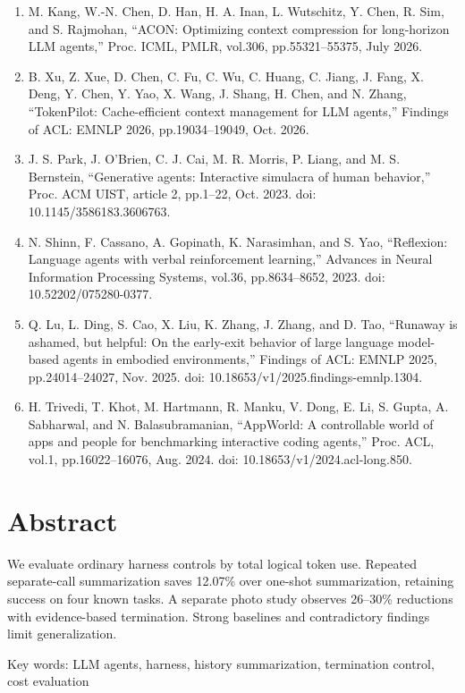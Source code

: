 \documentclass{article}
\begin{document}
\begin{enumerate}
\item M. Kang, W.-N. Chen, D. Han, H. A. Inan, L. Wutschitz, Y. Chen,
R. Sim, and S. Rajmohan,
``ACON: Optimizing context compression for long-horizon LLM agents,''
Proc. ICML, PMLR, vol.306, pp.55321--55375, July 2026.

\item B. Xu, Z. Xue, D. Chen, C. Fu, C. Wu, C. Huang, C. Jiang, J. Fang,
X. Deng, Y. Chen, Y. Yao, X. Wang, J. Shang, H. Chen, and N. Zhang,
``TokenPilot: Cache-efficient context management for LLM agents,''
Findings of ACL: EMNLP 2026, pp.19034--19049, Oct. 2026.

\item J. S. Park, J. O'Brien, C. J. Cai, M. R. Morris, P. Liang, and M. S. Bernstein,
``Generative agents: Interactive simulacra of human behavior,''
Proc. ACM UIST, article 2, pp.1--22, Oct. 2023.
doi: 10.1145/3586183.3606763.

\item N. Shinn, F. Cassano, A. Gopinath, K. Narasimhan, and S. Yao,
``Reflexion: Language agents with verbal reinforcement learning,''
Advances in Neural Information Processing Systems, vol.36, pp.8634--8652, 2023.
doi: 10.52202/075280-0377.

\item Q. Lu, L. Ding, S. Cao, X. Liu, K. Zhang, J. Zhang, and D. Tao,
``Runaway is ashamed, but helpful: On the early-exit behavior of large language model-based agents in embodied environments,''
Findings of ACL: EMNLP 2025, pp.24014--24027, Nov. 2025.
doi: 10.18653/v1/2025.findings-emnlp.1304.

\item H. Trivedi, T. Khot, M. Hartmann, R. Manku, V. Dong, E. Li, S. Gupta,
A. Sabharwal, and N. Balasubramanian,
``AppWorld: A controllable world of apps and people for benchmarking interactive coding agents,''
Proc. ACL, vol.1, pp.16022--16076, Aug. 2024.
doi: 10.18653/v1/2024.acl-long.850.

\end{enumerate}

\section*{Abstract}
We evaluate ordinary harness controls by total logical token use. Repeated separate-call summarization saves 12.07\% over one-shot summarization, retaining success on four known tasks. A separate photo study observes 26–30\% reductions with evidence-based termination. Strong baselines and contradictory findings limit generalization.

\noindent Key words: LLM agents, harness, history summarization, termination control, cost evaluation
\end{document}
